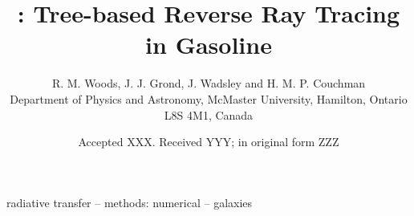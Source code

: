 \documentclass[fleqn,usenatbib]{mnras}
\title[]{\acro{}: Tree-based Reverse Ray Tracing 
in Gasoline}
\author[R. M. Woods et al.]{
R. M. Woods,
J. J. Grond, %
J. Wadsley %
and H. M. P. Couchman
\\
Department of Physics and Astronomy, McMaster University, Hamilton, Ontario L8S
 4M1, Canada}
\date{Accepted XXX. Received YYY; in original form ZZZ}
\newcommand{\acro}{TREVR}
\begin{document}
\label{firstpage}
\pagerange{\pageref{firstpage}--\pageref{lastpage}}
\maketitle

\begin{abstract}
\end{abstract}

\begin{keywords}
radiative transfer -- methods: numerical -- galaxies
\end{keywords}



\end{document}
